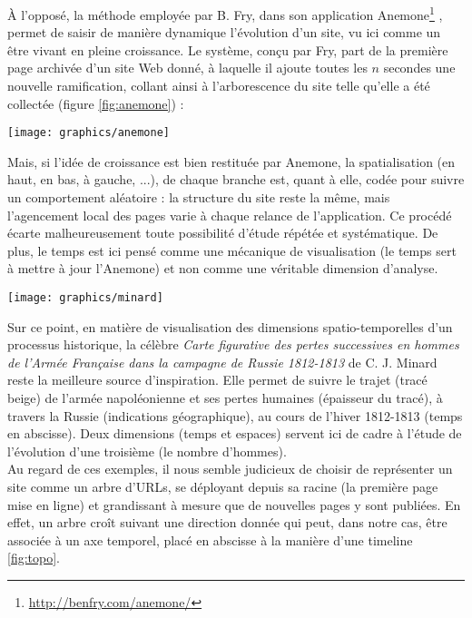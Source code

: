 \documentclass[symmetric,justified,marginals=raggedouter]{tufte-book}
\begin{document}
À l'opposé, la méthode employée par B. Fry, dans son application Anemone\footnote{\url{http://benfry.com/anemone/}} \citep[p.76-82]{fry_organic_2000}, permet de saisir de manière dynamique l'évolution d'un site, vu ici comme un être vivant en pleine croissance. Le système, conçu par Fry, part de la première page archi\-vée d'un site Web donné, à laquelle il ajoute toutes les $n$ secondes une nouvelle ramification, collant ainsi à l'arborescence du site telle qu'elle a été collectée (figure \ref{fig:anemone}) :

\begin{figure*}
  \texttt{[image: graphics/anemone]}
  \caption{Fonctionnement du système de visualisation Anemone, pour un site fictif \textit{inter.net}}
  \label{fig:anemone}
\end{figure*}

\noindent Mais, si l'idée de croissance est bien restituée par Anemone, la spatialisation (en haut, en bas, à gauche, ...), de chaque branche est, quant à elle, codée pour suivre un comportement aléatoire : la structure du site reste la même, mais l'agencement local des pages varie à chaque relance de l'application. Ce procédé écarte malheureusement toute possibilité d'étude répétée et systématique. De plus, le temps est ici pensé comme une mécanique de visualisation (le temps sert à mettre à jour l'Anemone) et non comme une véritable dimension d'analyse.

\begin{figure*}
  \texttt{[image: graphics/minard]}
  \caption{C.J. Minard, (1869), Carte figurative des pertes successives en hommes de l'Armée Française dans la campagne de Russie 1812-1813}
  \label{fig:minard}
\end{figure*}

\noindent Sur ce point, en matière de visualisation des dimensions spatio-tempo\-relles d'un processus historique, la célèbre \textit{Carte figurative des pertes successives en hommes de l'Armée Française dans la campagne de Russie 1812-1813} de C. J. Minard reste la meilleure source d'inspiration. Elle permet de suivre le trajet (tracé beige) de l'armée napoléonienne et ses pertes humaines (épaisseur du tracé), à travers la Russie (indications géographique), au cours de l'hiver 1812-1813 (temps en abscisse). Deux dimensions (temps et espaces) servent ici de cadre à l'étude de l'évolution d'une troisième (le nombre d'hommes). \\ 

\noindent Au regard de ces exemples, il nous semble judicieux de choisir de représenter un site comme un arbre d'URLs, se déployant depuis sa racine (la première page mise en ligne) et grandissant à mesure que de nouvelles pages y sont publiées. En effet, un arbre croît suivant une direction donnée qui peut, dans notre cas, être associée à un axe temporel, placé en abscisse à la manière d'une timeline \ref{fig:topo}. 
\end{document}
